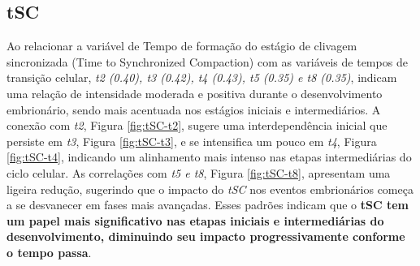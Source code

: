 \subsection*{tSC}
Ao relacionar a variável de Tempo de formação do estágio de clivagem sincronizada (Time to Synchronized Compaction) com as variáveis de tempos de transição celular, \textit{t2 (0.40), t3 (0.42), t4 (0.43), t5 (0.35) e t8 (0.35)}, indicam uma relação de intensidade moderada e positiva durante o desenvolvimento embrionário, sendo mais acentuada nos estágios iniciais e intermediários. A conexão com \textit{t2}, Figura \ref{fig:tSC-t2}, sugere uma interdependência inicial que persiste em \textit{t3}, Figura \ref{fig:tSC-t3}, e se intensifica um pouco em \textit{t4}, Figura \ref{fig:tSC-t4}, indicando um alinhamento mais intenso nas etapas intermediárias do ciclo celular. As correlações com \textit{t5 e t8}, Figura \ref{fig:tSC-t8}, apresentam uma ligeira redução, sugerindo que o impacto do \textit{tSC} nos eventos embrionários começa a se desvanecer em fases mais avançadas. Esses padrões indicam que o \textbf{tSC tem um papel mais significativo nas etapas iniciais e intermediárias do desenvolvimento, diminuindo seu impacto progressivamente conforme o tempo passa}. 

